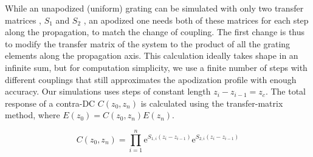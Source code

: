 \documentclass[osajnl,twocolumn,showpacs,superscriptaddress,10pt]{revtex4-1}
\newcommand{\me}{\mathrm{e}}
\begin{document}
While an unapodized (uniform) grating can be simulated with only two transfer matrices , $S_1$ and $S_2$ \cite{shi2013siliconContraDC}, an apodized one needs both of these matrices for each step along the propagation, to match the change of coupling. 
The first change is thus to modify the transfer matrix of the system to the product of all the grating elements along the propagation axis.
This calculation ideally takes shape in an infinite sum, but for computation simplicity, we use a finite number of steps with different couplings that still approximates the apodization profile with enough accuracy. 
Our simulations uses  steps of constant length $z_i-z_{i-1}=z_c$. 
The total response of a contra-DC $C(z_0,z_n)$ is calculated using the transfer-matrix method, where $E(z_0)=C(z_0,z_n) E(z_n)$.

\begin{equation}
\label{eq:CMatrix}
 C(z_0,z_n) =  \prod_{i=1}^{n}\me^{S_{1,i}(z_i-z_{i-1})}\me^{S_{2,i}(z_i-z_{i-1})}
\end{equation}



%
\end{document}
